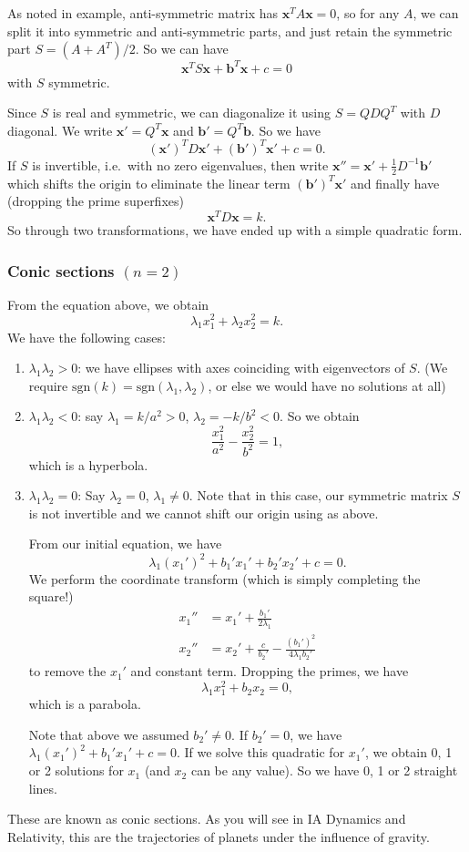 \documentclass[a4paper]{article}
\begin{document}
As noted in example, anti-symmetric matrix has $\mathbf{x}^TA\mathbf{x} = 0$, so for any $A$, we can split it into symmetric and anti-symmetric parts, and just retain the symmetric part $S = (A + A^T)/2$. So we can have
\[
  \mathbf{x}^T S\mathbf{x} + \mathbf{b}^T\mathbf{x} + c = 0
\]
with $S$ symmetric.

Since $S$ is real and symmetric, we can diagonalize it using $S = QDQ^T$ with $D$ diagonal. We write $\mathbf{x}' = Q^T \mathbf{x}$ and $\mathbf{b}' = Q^T \mathbf{b}$. So we have
\[
  (\mathbf{x}')^TD\mathbf{x}' + (\mathbf{b}')^T \mathbf{x}' + c = 0.
\]
If $S$ is invertible, i.e.\ with no zero eigenvalues, then write $\mathbf{x}'' = \mathbf{x}' + \frac{1}{2}D^{-1}\mathbf{b}'$ which shifts the origin to eliminate the linear term $(\mathbf{b}')^T\mathbf{x}'$ and finally have (dropping the prime superfixes)
\[
  \mathbf{x}^TD\mathbf{x} = k.
\]
So through two transformations, we have ended up with a simple quadratic form.

\subsubsection{Conic sections \texorpdfstring{$(n = 2)$}{(n = 2)}}
From the equation above, we obtain
\[
  \lambda_1x_1^2 + \lambda_2x_2^2 = k.
\]
We have the following cases:
\begin{enumerate}
  \item $\lambda_1\lambda_2 > 0$: we have ellipses with axes coinciding with eigenvectors of $S$. (We require $\mathrm{sgn}(k) = \mathrm{sgn}(\lambda_1,\lambda_2)$, or else we would have no solutions at all)
  \item $\lambda_1\lambda_2 < 0$: say $\lambda_1 = k/a^2 > 0$, $\lambda_2 = -k/b^2 < 0$. So we obtain
    \[
      \frac{x_1^2}{a^2} - \frac{x_2^2}{b^2} = 1,
    \]
    which is a hyperbola.
  \item $\lambda_1\lambda_2 = 0$: Say $\lambda_2 = 0$, $\lambda_1\not= 0$. Note that in this case, our symmetric matrix $S$ is not invertible and we cannot shift our origin using as above.

    From our initial equation, we have
    \[
      \lambda_1(x_1')^2 + b_1'x_1' + b_2' x_2' + c = 0.
    \]
    We perform the coordinate transform (which is simply completing the square!)
    \begin{align*}
      x_1'' &= x_1' + \frac{b_1'}{2\lambda_1}\\
      x_2'' &= x_2' + \frac{c}{b_2'} - \frac{(b_1')^2}{4\lambda_1b_2'}
    \end{align*}
    to remove the $x_1'$ and constant term. Dropping the primes, we have
    \[
      \lambda_1 x_1^2 + b_2 x_2 = 0,
    \]
    which is a parabola.

    Note that above we assumed $b_2'\not= 0$. If $b_2' = 0$, we have $\lambda_1(x_1')^2 + b_1' x_1' + c = 0$. If we solve this quadratic for $x_1'$, we obtain 0, 1 or 2 solutions for $x_1$ (and $x_2$ can be any value). So we have 0, 1 or 2 straight lines.
\end{enumerate}
These are known as conic sections. As you will see in IA Dynamics and Relativity, this are the trajectories of planets under the influence of gravity.
\end{document}

